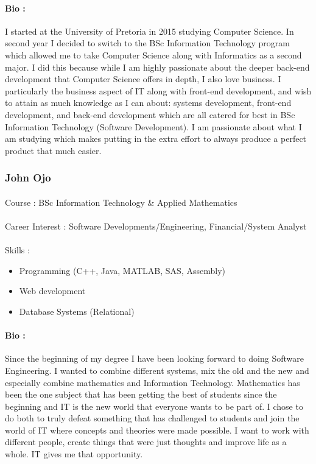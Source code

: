\documentclass[11pt]{article}
\begin{document}
\paragraph{Bio :}I started at the University of Pretoria in 2015 studying Computer Science. In second year I decided to switch to the BSc Information Technology program which allowed me to take Computer Science along with Informatics as a second major. I did this because while I am highly passionate about the deeper back-end development that Computer Science offers in depth, I also love business. I particularly the business aspect of IT along with front-end development, and wish to attain as much knowledge as I can about: systems development, front-end development, and back-end development which are all catered for best in BSc Information Technology (Software Development). I am passionate about what I am studying which makes putting in the extra effort to always produce a perfect product that much easier. 

\subsubsection{John Ojo}
\paragraph{}Course : BSc Information Technology \& Applied Mathematics
\paragraph{}Career Interest : Software Developments/Engineering, Financial/System Analyst
\paragraph{}Skills : 
\begin{itemize}
\item Programming (C++, Java, MATLAB, SAS, Assembly)
\item Web development
\item Database Systems (Relational)
\end{itemize}
\paragraph{Bio :}Since the beginning of my degree I have been looking forward to doing Software Engineering. I wanted to combine different systems, mix the old and the new and especially combine mathematics and Information Technology. Mathematics has been the one subject that has been getting the best of students since the beginning and IT is the new world that everyone wants to be part of. I chose to do both to truly defeat something that has challenged to students and join the world of IT where concepts and theories were made possible. I want to work with different people, create things that were just thoughts and improve life as a whole. IT gives 
me that opportunity.
\end{document}
